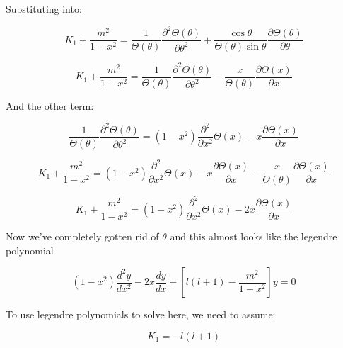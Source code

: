 \documentclass[12pt]{article}
\renewcommand{\_}{\kern-1.5pt\textunderscore\kern-1.5pt}
\begin{document}
Substituting into:\par

 \[ K_{1}+\frac{m^{2}}{1-x^{2}}=\frac{1}{ \Theta  \left(  \theta  \right) }\frac{ \partial ^{2} \Theta  \left(  \theta  \right) }{ \partial  \theta ^{2}}+\frac{\cos  \theta }{ \Theta  \left(  \theta  \right) \sin  \theta }\frac{ \partial  \Theta  \left(  \theta  \right) }{ \partial  \theta } \] \par

 \[ K_{1}+\frac{m^{2}}{1-x^{2}}=\frac{1}{ \Theta  \left(  \theta  \right) }\frac{ \partial ^{2} \Theta  \left(  \theta  \right) }{ \partial  \theta ^{2}}-\frac{x}{ \Theta  \left(  \theta  \right) }\frac{ \partial  \Theta  \left( x \right) }{ \partial x} \] \par

And the other term:\par

 \[ \frac{1}{ \Theta  \left(  \theta  \right) }\frac{ \partial ^{2} \Theta  \left(  \theta  \right) }{ \partial  \theta ^{2}}= \left( 1-x^{2} \right) \frac{ \partial ^{2}}{ \partial x^{2}} \Theta  \left( x \right) -x\frac{ \partial  \Theta  \left( x \right) }{ \partial x} \] \par

 \[ K_{1}+\frac{m^{2}}{1-x^{2}}= \left( 1-x^{2} \right) \frac{ \partial ^{2}}{ \partial x^{2}} \Theta  \left( x \right) -x\frac{ \partial  \Theta  \left( x \right) }{ \partial x}-\frac{x}{ \Theta  \left(  \theta  \right) }\frac{ \partial  \Theta  \left( x \right) }{ \partial x} \] \par

 \[ K_{1}+\frac{m^{2}}{1-x^{2}}= \left( 1-x^{2} \right) \frac{ \partial ^{2}}{ \partial x^{2}} \Theta  \left( x \right) -2x\frac{ \partial  \Theta  \left( x \right) }{ \partial x} \] \par


\vspace{\baselineskip}
Now we’ve completely gotten rid of  \(  \theta  \)  and this almost looks like the legendre polynomial\par

 \[  \left( 1-x^{2} \right) \frac{d^{2}y}{dx^{2}}-2x\frac{dy}{dx}+ \left[ l \left( l+1 \right) -\frac{m^{2}}{1-x^{2}} \right] y=0 \] \par

To use legendre polynomials to solve here, we need to assume:\par

 \[ K_{1}=-l \left( l+1 \right)  \] \par
\end{document}
